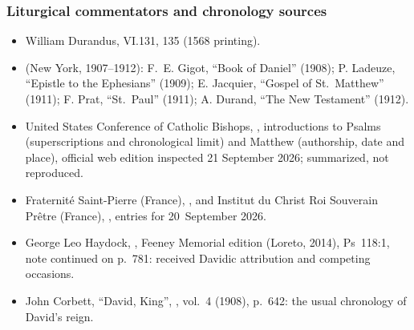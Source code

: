 {\subsubsection*{Liturgical commentators and chronology sources}
\begin{itemize}\setlength{\itemsep}{0.15em}\setlength{\parskip}{0pt}
\item William Durandus,  VI.131, 135 (1568 printing).
\item {} (New York, 1907--1912): F.~E. Gigot, ``Book of Daniel'' (1908); P. Ladeuze, ``Epistle to the Ephesians'' (1909); E. Jacquier, ``Gospel of St.~Matthew'' (1911); F. Prat, ``St.~Paul'' (1911); A. Durand, ``The New Testament'' (1912).
\item United States Conference of Catholic Bishops, , introductions to Psalms (superscriptions and chronological limit) and Matthew (authorship, date and place), official web edition inspected 21 September 2026; summarized, not reproduced.
\item Fraternité Saint-Pierre (France), , and Institut du Christ Roi Souverain Prêtre (France), , entries for 20~September 2026.
\item George Leo Haydock, , Feeney Memorial edition (Loreto, 2014), Ps~118:1, note continued on p.~781: received Davidic attribution and competing occasions.
\item John Corbett, ``David, King'', , vol.~4 (1908), p.~642: the usual chronology of David's reign.
\end{itemize}
\par}
